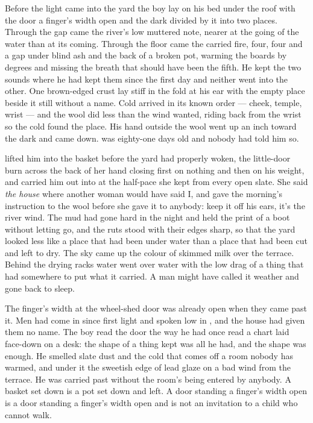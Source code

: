 
Before the light came into the yard the boy lay on his bed under the  roof with the door a finger's width open and the dark divided by it into two places. Through the gap came the river's low muttered note, nearer at the going of the water than at its coming. Through the floor came the carried fire, four, four and a gap under blind ash and the back of a broken pot, warming the boards by degrees and missing the breath that should have been the fifth. He kept the two sounds where he had kept them since the first day and neither went into the other. One brown-edged crust lay stiff in the fold at his ear with the empty place beside it still without a name. Cold arrived in its known order --- cheek, temple, wrist --- and the wool did less than the wind wanted, riding back from the wrist so the cold found the place. His hand outside the wool went up an inch toward the dark and came down.  was eighty-one days old and nobody had told him so.

 lifted him into the basket before the yard had properly woken, the little-door burn across the back of her hand closing first on nothing and then on his weight, and carried him out into  at the half-pace she kept from every open slate. She said \emph{the house} where another woman would have said I, and gave the morning's instruction to the wool before she gave it to anybody: keep it off his ears, it's the river wind. The mud had gone hard in the night and held the print of a boot without letting go, and the ruts stood with their edges sharp, so that the yard looked less like a place that had been under water than a place that had been cut and left to dry. The sky came up the colour of skimmed milk over the terrace. Behind the drying racks water went over water with the low drag of a thing that had somewhere to put what it carried. A man might have called it weather and gone back to sleep.

The finger's width at the wheel-shed door was already open when they came past it. Men had come in since first light and spoken low in , and the house had given them no name. The boy read the door the way he had once read a chart laid face-down on a desk: the shape of a thing kept was all he had, and the shape was enough. He smelled slate dust and the cold that comes off a room nobody has warmed, and under it the sweetish edge of lead glaze on a bad wind from the terrace. He was carried past without the room's being entered by anybody. A basket set down is a pot set down and left. A door standing a finger's width open is a door standing a finger's width open and is not an invitation to a child who cannot walk.


